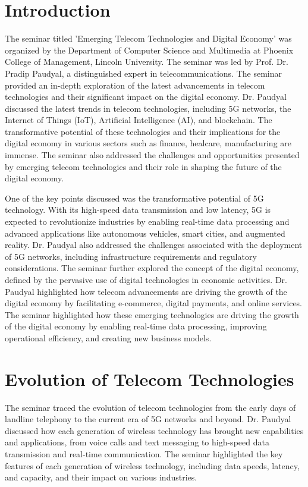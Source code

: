 \documentclass[conference]{IEEEtran}
\begin{document}
\section{Introduction}
The seminar titled 'Emerging Telecom Technologies and Digital Economy' was organized by the Department of Computer Science and Multimedia at Phoenix College of Management, Lincoln University. The seminar was led by Prof. Dr. Pradip Paudyal, a distinguished expert in telecommunications. The seminar provided an in-depth exploration of the latest advancements in telecom technologies and their significant impact on the digital economy.
Dr. Paudyal discussed the latest trends in telecom technologies, including 5G networks, the Internet of Things (IoT), Artificial Intelligence (AI), and blockchain. The transformative potential of these technologies and their implications for the digital economy in various sectors such as finance, healcare, manufacturing are immense. \cite{Singanamalla2022} The seminar also addressed the challenges and opportunities presented by emerging telecom technologies and their role in shaping the future of the digital economy. \par One of the key points discussed was the transformative potential of 5G technology. With its high-speed data transmission and low latency, 5G is expected to revolutionize industries by enabling real-time data processing and advanced applications like autonomous vehicles, smart cities, and augmented reality. Dr. Paudyal also addressed the challenges associated with the deployment of 5G networks, including infrastructure requirements and regulatory considerations. 
The seminar further explored the concept of the digital economy, defined by the pervasive use of digital technologies in economic activities. Dr. Paudyal highlighted how telecom advancements are driving the growth of the digital economy by facilitating e-commerce, digital payments, and online services. The seminar highlighted how these emerging technologies are driving the growth of the digital economy by enabling real-time data processing, improving operational efficiency, and creating new business models.

\section{Evolution of Telecom Technologies}
The seminar traced the evolution of telecom technologies from the early days of landline telephony to the current era of 5G networks and beyond. Dr. Paudyal discussed how each generation of wireless technology has brought new capabilities and applications, from voice calls and text messaging to high-speed data transmission and real-time communication. The seminar highlighted the key features of each generation of wireless technology, including data speeds, latency, and capacity, and their impact on various industries.
\end{document}
